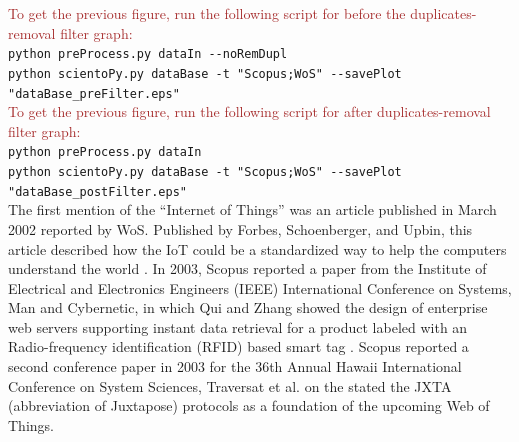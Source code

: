 \documentclass[symmetry,article,accept,moreauthors,pdftex10pt,a4paper]{mdpi}
\begin{document}
\noindent
\textcolor{brown}{To get the previous figure, run the following script for before the duplicates-removal filter graph:}\\
\hspace*{0.5cm}\verb|python preProcess.py dataIn --noRemDupl|\\
\hspace*{0.5cm}\verb|python scientoPy.py dataBase -t "Scopus;WoS" --savePlot "dataBase_preFilter.eps"|\\

\noindent
\textcolor{brown}{To get the previous figure, run the following script for after duplicates-removal filter graph:}\\
\hspace*{0.5cm}\verb|python preProcess.py dataIn|\\
\hspace*{0.5cm}\verb|python scientoPy.py dataBase -t "Scopus;WoS" --savePlot "dataBase_postFilter.eps"|\\


The first mention of the ``Internet of Things'' was an article published in March 2002 reported by WoS. Published by Forbes, Schoenberger, and Upbin, this article described how the IoT could be a standardized way to help the computers understand the world \cite{ISI:000174207300032}. In 2003, Scopus reported a paper from the Institute of Electrical and Electronics Engineers (IEEE) International Conference on Systems, Man and Cybernetic, in which Qui and Zhang showed the design of enterprise web servers supporting instant data retrieval for a product labeled with an Radio-frequency identification (RFID) based smart tag \cite{Qiu20032661}. Scopus reported a second conference paper in 2003 for the 36th Annual Hawaii International Conference on System Sciences, Traversat et al. on the stated the JXTA (abbreviation of Juxtapose) protocols as a foundation of the upcoming Web of Things\cite{Traversat2003}. 

\end{document}
